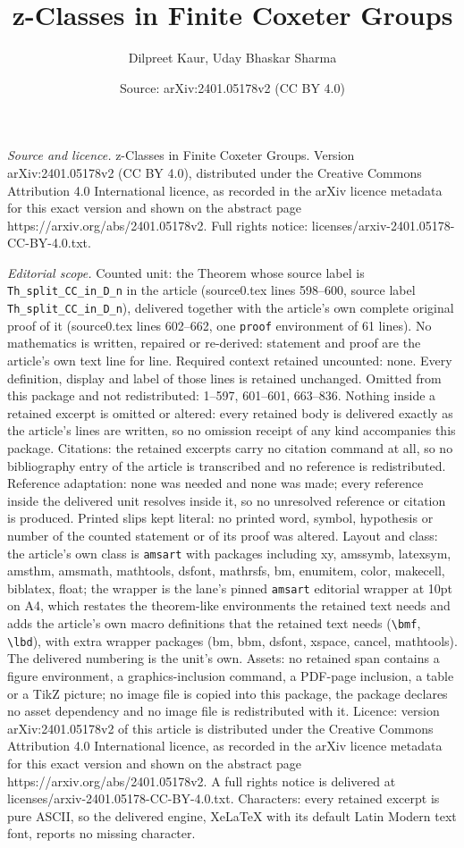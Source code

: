 \documentclass[10pt,a4paper]{amsart}
\title[z-Classes in Finite Coxeter Groups]{z-Classes in Finite Coxeter Groups}
\author{Dilpreet Kaur, Uday Bhaskar Sharma}
\date{Source: arXiv:2401.05178v2 (CC BY 4.0)}
\begin{document}
\maketitle

\noindent\emph{Source and licence.} z-Classes in Finite Coxeter Groups. Version arXiv:2401.05178v2 (CC BY 4.0), distributed under the Creative Commons Attribution 4.0 International licence, as recorded in the arXiv licence metadata for this exact version and shown on the abstract page https://arxiv.org/abs/2401.05178v2. Full rights notice: licenses/arxiv-2401.05178-CC-BY-4.0.txt.\par\smallskip

\noindent\textit{Editorial scope.} Counted unit: the Theorem whose source label is \texttt{Th\_split\_CC\_in\_D\_n} in the article (source0.tex lines 598--600, source label \texttt{Th\_split\_CC\_in\_D\_n}), delivered together with the article's own complete original proof of it (source0.tex lines 602--662, one \texttt{proof} environment of 61 lines). No mathematics is written, repaired or re-derived: statement and proof are the article's own text line for line. Required context retained uncounted: none. Every definition, display and label of those lines is retained unchanged. Omitted from this package and not redistributed: 1--597, 601--601, 663--836. Nothing inside a retained excerpt is omitted or altered: every retained body is delivered exactly as the article's lines are written, so no omission receipt of any kind accompanies this package. Citations: the retained excerpts carry no citation command at all, so no bibliography entry of the article is transcribed and no reference is redistributed. Reference adaptation: none was needed and none was made; every reference inside the delivered unit resolves inside it, so no unresolved reference or citation is produced. Printed slips kept literal: no printed word, symbol, hypothesis or number of the counted statement or of its proof was altered. Layout and class: the article's own class is \texttt{amsart} with packages including xy, amssymb, latexsym, amsthm, amsmath, mathtools, dsfont, mathrsfs, bm, enumitem, color, makecell, biblatex, float; the wrapper is the lane's pinned \texttt{amsart} editorial wrapper at 10pt on A4, which restates the theorem-like environments the retained text needs and adds the article's own macro definitions that the retained text needs (\texttt{\textbackslash bmf}, \texttt{\textbackslash lbd}), with extra wrapper packages (bm, bbm, dsfont, xspace, cancel, mathtools). The delivered numbering is the unit's own. Assets: no retained span contains a figure environment, a graphics-inclusion command, a PDF-page inclusion, a table or a TikZ picture; no image file is copied into this package, the package declares no asset dependency and no image file is redistributed with it. Licence: version arXiv:2401.05178v2 of this article is distributed under the Creative Commons Attribution 4.0 International licence, as recorded in the arXiv licence metadata for this exact version and shown on the abstract page https://arxiv.org/abs/2401.05178v2. A full rights notice is delivered at licenses/arxiv-2401.05178-CC-BY-4.0.txt. Characters: every retained excerpt is pure ASCII, so the delivered engine, XeLaTeX with its default Latin Modern text font, reports no missing character.
\end{document}
